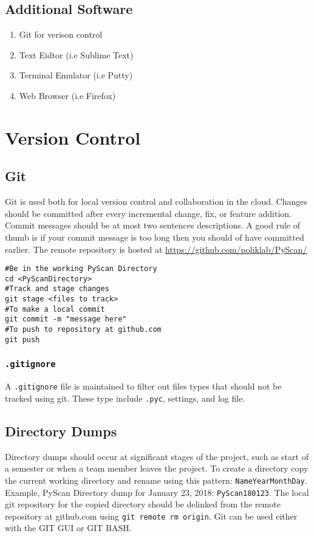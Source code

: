 \documentclass[11pt]{article}
\def\code#1{\texttt{#1}}
\begin{document}
\subsection{Additional Software}
\begin{enumerate}
    \item Git for verison control
    \item Text Eidtor (i.e Sublime Text)
    \item Terminal Emulator (i.e Putty)
    \item Web Browser (i.e Firefox)
\end{enumerate}
\section{Version Control}
\subsection{Git}
Git is used both for local version control and collaboration in the cloud. Changes should be committed after every incremental change, fix, or feature addition. Commit messages should be at most two sentences descriptions. A good rule of thumb is if your commit message is too long then you should of have committed earlier. The remote repository is hosted at \url{https://github.com/poliklab/PyScan/}
\begin{lstlisting}
#Be in the working PyScan Directory 
cd <PyScanDirectory>
#Track and stage changes
git stage <files to track>
#To make a local commit 
git commit -m "message here"
#To push to repository at github.com
git push
\end{lstlisting}
\subsubsection{\code{.gitignore}}
A \code{.gitignore} file is maintained to filter out files types that should not be tracked using git. These type include \code{.pyc}, settings, and log file.
\subsection{Directory Dumps}
Directory dumps should occur at significant stages of the project, such as start of a semester or when a team member leaves the project. To create a directory copy the current working directory and rename using this pattern: \texttt{NameYearMonthDay}. Example, PyScan Directory dump for January 23, 2018: \texttt{PyScan180123}. The local git repository for the copied directory should be delinked from the remote repository at github.com using \code{git remote rm origin}. Git can be used either with the GIT GUI or GIT BASH.
\end{document}
